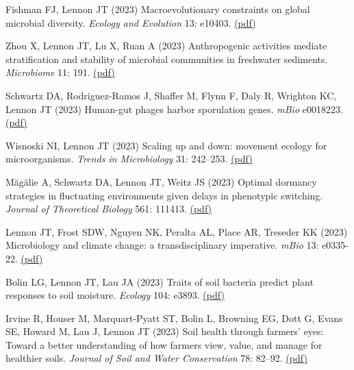 \documentclass[11pt]{article}
\begin{document}
\begin{etaremune}
\item Fishman FJ, Lennon JT (2023) Macroevolutionary constraints on global microbial diversity. \textit{Ecology and Evolution} 13: e10403. \href{https://lennonlab.github.io/assets/publications/Fishman_Lennon_2023.pdf}{(pdf)}

\item Zhou X, Lennon JT, Lu X, Ruan A (2023) Anthropogenic activities mediate stratification and stability of microbial communities in freshwater sediments. \textit{Microbiome} 11: 191. \href{https://lennonlab.github.io/assets/publications/Zhou_etal_2023.pdf}{(pdf)}

\item Schwartz DA, Rodriguez-Ramos J, Shaffer M, Flynn F, Daly R, Wrighton KC, Lennon JT (2023) Human-gut phages harbor sporulation genes. \textit{mBio} e0018223. \href{https://lennonlab.github.io/assets/publications/Schwartz_etal_2023a.pdf}{(pdf)}

\item Wisnoski NI, Lennon JT (2023) Scaling up and down: movement ecology for microorganisms. \textit{Trends in Microbiology} 31: 242–253. \href{https://lennonlab.github.io/assets/publications/Wisnoski_Lennon_2023.pdf}{(pdf)}

\item Măgălie A, Schwartz DA, Lennon JT, Weitz JS (2023) Optimal dormancy strategies in fluctuating environments given delays in phenotypic switching. \textit{Journal of Theoretical Biology} 561: 111413. \href{https://lennonlab.github.io/assets/publications/Magalie_etal_2023.pdf}{(pdf)}

\item Lennon JT, Frost SDW, Nguyen NK, Peralta AL, Place AR, Treseder KK (2023) Microbiology and climate change: a transdisciplinary imperative. \textit{mBio} 13: e0335-22. \href{https://lennonlab.github.io/assets/publications/Lennon_etal_2023.pdf}{(pdf)}

\item Bolin LG, Lennon JT, Lau JA (2023) Traits of soil bacteria predict plant responses to soil moisture. \textit{Ecology} 104: e3893. \href{https://lennonlab.github.io/assets/publications/Bolin_etal_2023.pdf}{(pdf)}

\item Irvine R, Houser M, Marquart-Pyatt ST, Bolin L, Browning EG, Dott G, Evans SE, Howard M, Lau J, Lennon JT (2023) Soil health through farmers’ eyes: Toward a better understanding of how farmers view, value, and manage for healthier soils. \textit{Journal of Soil and Water Conservation} 78: 82–92. \href{https://lennonlab.github.io/assets/publications/Irvine_etal_2023.pdf}{(pdf)}


\end{etaremune}
\end{document}
